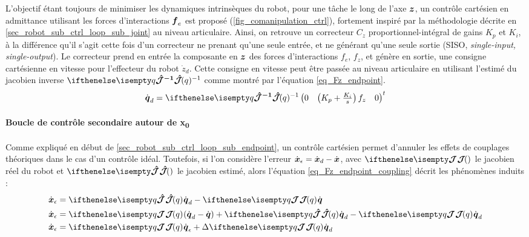 \documentclass[12pt, a4paper]{article} %
\numberwithin{equation}{section}
\begin{document}
L'objectif étant toujours de minimiser les dynamiques intrinsèques du robot, pour une tâche le long de l'axe $ \vect{z} $, un contrôle cartésien en admittance utilisant les forces d'interactions $\vect{f}_e$ est proposé (\cref{fig_comanipulation_ctrl}), fortement inspiré par la méthodologie décrite en \cref{sec_robot_sub_ctrl_loop_sub_joint} au niveau articulaire. Ainsi, on retrouve un correcteur $ C_z $ proportionnel-intégral de gains $ K_p $ et $ K_i $, à la différence qu'il s'agit cette fois d'un correcteur ne prenant qu'une seule entrée, et ne générant qu'une seule sortie (SISO, \textit{single-input, single-output}). Le correcteur prend en entrée la composante en $ \vect{z} $ des forces d'interactions $ f_e $, $ f_z $, et génère en sortie, une consigne cartésienne en vitesse pour l'effecteur du robot $ \dot{z}_d $. Cette consigne en vitesse peut être passée au niveau articulaire en utilisant l'estimé du jacobien inverse $ \jacobianHat{q}{}{-1} $ comme montré par l'équation \cref{eq_Fz_endpoint}.
%
\begin{equation} \label{eq_Fz_endpoint}
	\dot{\vect{q}}_d = \jacobianHat{q}{}{-1} \begin{pmatrix} 0 & \left(K_p + \frac{K_i}{s}\right)f_z & 0 \end{pmatrix}^t
\end{equation}
%
\paragraph{Boucle de contrôle secondaire autour de x\textsubscript{0}} 

Comme expliqué en début de \cref{sec_robot_sub_ctrl_loop_sub_endpoint}, un contrôle cartésien permet d'annuler les effets de couplages théoriques dans le cas d'un contrôle idéal. Toutefois, si l'on considère l'erreur $ \dot{\vect{X}}_\epsilon = \dot{\vect{X}}_d - \dot{\vect{X}} $, avec $\jacobian{}{}{}$ le jacobien réel du robot et $\jacobianHat{}{}{}$ le jacobien estimé, alors l'équation \cref{eq_Fz_endpoint_coupling} décrit les phénomènes induits :
%
\begin{equation} \label{eq_Fz_endpoint_coupling}
\begin{split}
	\dot{\vect{X}}_\epsilon &= \jacobianHat{q}{}{}\dot{\vect{q}}_d - \jacobian{q}{}{}\dot{\vect{q}} \\
	\dot{\vect{X}}_\epsilon &= \jacobian{q}{}{}(\dot{\vect{q}}_d - \dot{\vect{q}}) + \jacobianHat{q}{}{}\dot{\vect{q}}_d - \jacobian{q}{}{}\dot{\vect{q}}_d \\
	\dot{\vect{X}}_\epsilon &= \jacobian{q}{}{}\dot{\vect{q}}_{\epsilon} + \Delta\jacobian{q}{}{}\dot{\vect{q}}_d
\end{split}
\end{equation}
\end{document}
